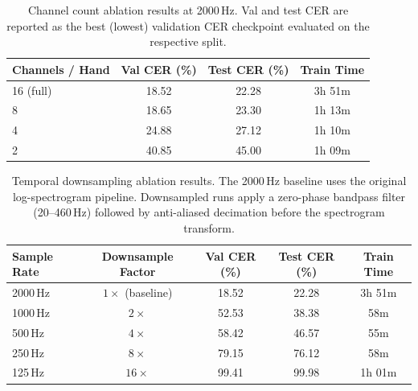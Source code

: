 
\begin{table}[h]
  \centering
  \caption{Channel count ablation results at 2000\,Hz. Val and test CER are
           reported as the best (lowest) validation CER checkpoint evaluated
           on the respective split.}
  \label{tab:channel_ablation}
  \begin{tabular}{lccc}
    \toprule
    \textbf{Channels / Hand} & \textbf{Val CER (\%)} & \textbf{Test CER (\%)} & \textbf{Train Time} \\
    \midrule
    16 (full)  & 18.52 & 22.28 & 3h 51m \\
     8         & 18.65 & 23.30 & 1h 13m \\
     4         & 24.88 & 27.12 & 1h 10m \\
     2         & 40.85 & 45.00 & 1h 09m \\
    \bottomrule
  \end{tabular}
\end{table}



\begin{table}[h]
  \centering
  \caption{Temporal downsampling ablation results. The 2000\,Hz baseline uses
           the original log-spectrogram pipeline. Downsampled runs apply a
           zero-phase bandpass filter (20--460\,Hz) followed by anti-aliased
           decimation before the spectrogram transform.}
  \label{tab:sampling_ablation}
  \begin{tabular}{lcccc}
    \toprule
    \textbf{Sample Rate} & \textbf{Downsample Factor} & \textbf{Val CER (\%)} & \textbf{Test CER (\%)} & \textbf{Train Time} \\
    \midrule
    2000\,Hz & $1\times$ (baseline) & 18.52 & 22.28 & 3h 51m \\
    1000\,Hz & $2\times$            & 52.53 & 38.38 &    58m \\
     500\,Hz & $4\times$            & 58.42 & 46.57 &    55m \\
     250\,Hz & $8\times$            & 79.15 & 76.12 &    58m \\
     125\,Hz & $16\times$           & 99.41 & 99.98 & 1h 01m \\
    \bottomrule
  \end{tabular}
\end{table}
